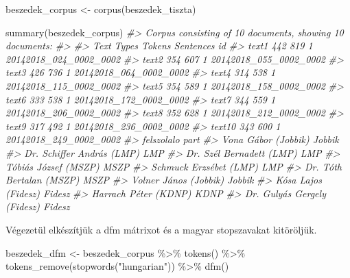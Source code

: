 \documentclass[
]{book}
\newenvironment{Shaded}{\begin{snugshade}}{\end{snugshade}}
\newcommand{\CommentTok}[1]{\textcolor[rgb]{0.56,0.35,0.01}{\textit{#1}}}
\newcommand{\FunctionTok}[1]{\textcolor[rgb]{0.00,0.00,0.00}{#1}}
\newcommand{\NormalTok}[1]{#1}
\newcommand{\OtherTok}[1]{\textcolor[rgb]{0.56,0.35,0.01}{#1}}
\newcommand{\SpecialCharTok}[1]{\textcolor[rgb]{0.00,0.00,0.00}{#1}}
\newcommand{\StringTok}[1]{\textcolor[rgb]{0.31,0.60,0.02}{#1}}
\begin{document}
\begin{Shaded}
\begin{Highlighting}[]
\NormalTok{beszedek\_corpus }\OtherTok{\textless{}{-}} \FunctionTok{corpus}\NormalTok{(beszedek\_tiszta)}

\FunctionTok{summary}\NormalTok{(beszedek\_corpus)}
\CommentTok{\#\textgreater{} Corpus consisting of 10 documents, showing 10 documents:}
\CommentTok{\#\textgreater{} }
\CommentTok{\#\textgreater{}    Text Types Tokens Sentences                     id}
\CommentTok{\#\textgreater{}   text1   442    819         1 20142018\_024\_0002\_0002}
\CommentTok{\#\textgreater{}   text2   354    607         1 20142018\_055\_0002\_0002}
\CommentTok{\#\textgreater{}   text3   426    736         1 20142018\_064\_0002\_0002}
\CommentTok{\#\textgreater{}   text4   314    538         1 20142018\_115\_0002\_0002}
\CommentTok{\#\textgreater{}   text5   354    589         1 20142018\_158\_0002\_0002}
\CommentTok{\#\textgreater{}   text6   333    538         1 20142018\_172\_0002\_0002}
\CommentTok{\#\textgreater{}   text7   344    559         1 20142018\_206\_0002\_0002}
\CommentTok{\#\textgreater{}   text8   352    628         1 20142018\_212\_0002\_0002}
\CommentTok{\#\textgreater{}   text9   317    492         1 20142018\_236\_0002\_0002}
\CommentTok{\#\textgreater{}  text10   343    600         1 20142018\_249\_0002\_0002}
\CommentTok{\#\textgreater{}                   felszolalo   part}
\CommentTok{\#\textgreater{}          Vona Gábor (Jobbik) Jobbik}
\CommentTok{\#\textgreater{}    Dr. Schiffer András (LMP)    LMP}
\CommentTok{\#\textgreater{}     Dr. Szél Bernadett (LMP)    LMP}
\CommentTok{\#\textgreater{}         Tóbiás József (MSZP)   MSZP}
\CommentTok{\#\textgreater{}       Schmuck Erzsébet (LMP)    LMP}
\CommentTok{\#\textgreater{}     Dr. Tóth Bertalan (MSZP)   MSZP}
\CommentTok{\#\textgreater{}        Volner János (Jobbik) Jobbik}
\CommentTok{\#\textgreater{}          Kósa Lajos (Fidesz) Fidesz}
\CommentTok{\#\textgreater{}         Harrach Péter (KDNP)   KDNP}
\CommentTok{\#\textgreater{}  Dr. Gulyás Gergely (Fidesz) Fidesz}
\end{Highlighting}
\end{Shaded}

Végezetül elkészítjük a dfm mátrixot és a magyar stopszavakat
kitöröljük.

\begin{Shaded}
\begin{Highlighting}[]
\NormalTok{beszedek\_dfm }\OtherTok{\textless{}{-}}\NormalTok{ beszedek\_corpus }\SpecialCharTok{\%\textgreater{}\%}
  \FunctionTok{tokens}\NormalTok{() }\SpecialCharTok{\%\textgreater{}\%}
  \FunctionTok{tokens\_remove}\NormalTok{(}\FunctionTok{stopwords}\NormalTok{(}\StringTok{"hungarian"}\NormalTok{)) }\SpecialCharTok{\%\textgreater{}\%}
  \FunctionTok{dfm}\NormalTok{()}
\end{Highlighting}
\end{Shaded}
\end{document}
